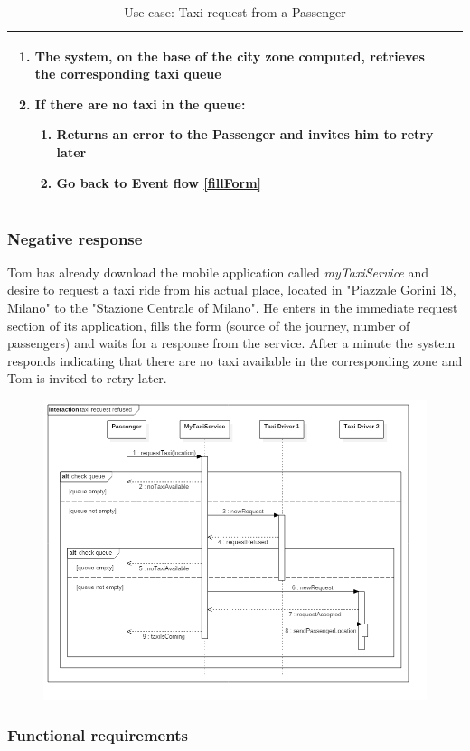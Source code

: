 \begin{table}[H]
\begin{tabularx}{\textwidth}{|l|X|}
\begin{enumerate}
				\item The system, on the base of the city zone computed, retrieves the corresponding taxi queue
				\item If there are no taxi in the queue:
				\begin{enumerate}
					\item Returns an error to the Passenger and invites him to retry later
					\item Go back to Event flow \ref{fillForm}
				\end{enumerate}
			\end{enumerate} \\ \hline
\end{tabularx}
\caption{Use case: Taxi request from a Passenger}
\end{table}


\subsubsection{Negative response}
Tom has already download the mobile application called \textit{myTaxiService} and desire to request a taxi ride from his actual place, located in "Piazzale Gorini 18, Milano" to the "Stazione Centrale of Milano". He enters in the immediate request section of its application, fills the form (source of the journey, number of passengers) and waits for a response from the service.
After a minute the system responds indicating that there are no taxi available in the corresponding zone and Tom is invited to retry later.
\begin{figure}[H]
\centering
\includegraphics[scale=0.5]{Images/sequence_taxi_request_refused}
\end{figure}

\subsubsection{Functional requirements}
